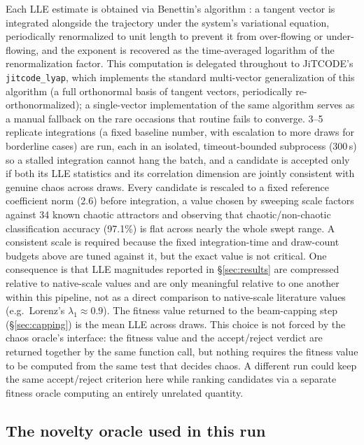 \documentclass[11pt]{article}
\begin{document}
Each LLE estimate is obtained via Benettin's algorithm
\citep{benettin1980lyapunov,parker1989practical}: a tangent vector is
integrated alongside the trajectory under the system's variational equation,
periodically renormalized to unit length to prevent it from over-flowing or
under-flowing, and the exponent is recovered as the time-averaged logarithm
of the renormalization factor. This computation is delegated throughout to
JiTCODE's \citep{ansmann2018efficiently} \texttt{jitcode\_lyap}, which
implements the standard multi-vector generalization of this algorithm (a
full orthonormal basis of tangent vectors, periodically re-orthonormalized);
a single-vector implementation of the same algorithm serves as a manual
fallback on the rare occasions that routine fails to converge. 3--5
replicate integrations (a fixed baseline number, with escalation to more
draws for borderline cases) are run, each in an isolated, timeout-bounded
subprocess (300\,s) so a stalled integration cannot hang the batch, and a
candidate is accepted only if both its LLE statistics and its correlation
dimension are jointly consistent with genuine chaos across draws. Every candidate is rescaled
to a fixed reference coefficient norm (2.6) before integration, a value
chosen by sweeping scale factors against 34 known chaotic attractors and
observing that chaotic/non-chaotic classification accuracy (97.1\%) is flat
across nearly the whole swept range. A consistent scale is required because
the fixed integration-time and draw-count budgets above are tuned against it,
but the exact value is not critical. One consequence is that LLE magnitudes
reported in \S\ref{sec:results} are compressed relative to native-scale
values and are only meaningful relative to one another within this pipeline,
not as a direct comparison to native-scale literature values (e.g.\ Lorenz's
$\lambda_1 \approx 0.9$). The fitness value returned to the beam-capping step
(\S\ref{sec:capping}) is the mean LLE across draws. This choice is not
forced by the chaos oracle's interface: the fitness value and the
accept/reject verdict are returned together by the same function call, but
nothing requires the fitness value to be computed from the same test that
decides chaos. A different run could keep the same accept/reject criterion
here while ranking candidates via a separate fitness oracle computing an
entirely unrelated quantity.

\subsection{The novelty oracle used in this run}
\label{sec:novelty-oracle}
\end{document}
